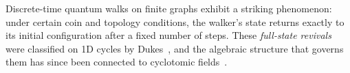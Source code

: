 Discrete-time quantum walks on finite graphs exhibit a striking
phenomenon: under certain coin and topology conditions, the walker's
state returns exactly to its initial configuration after a fixed number
of steps. These \emph{full-state revivals} were classified on 1D cycles
by Dukes~\cite{Dukes2014}, and the algebraic structure that governs
them has since been connected to cyclotomic fields~\cite{Washington1997}.
